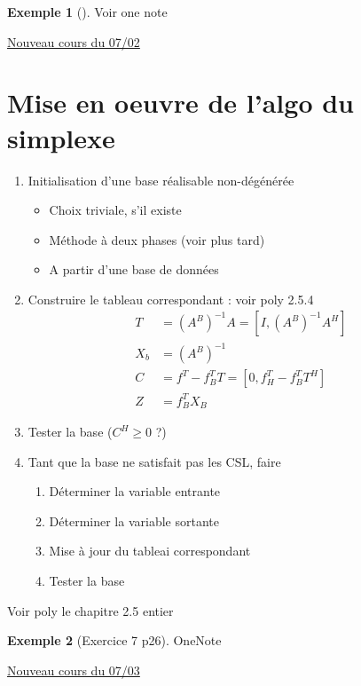 \documentclass{article}
\theoremstyle{plain}%
\theoremstyle{definition}
\newtheorem{exmp}{Exemple}[section]
\theoremstyle{remark}
\begin{document}
\begin{exmp}[]
    Voir one note
\end{exmp}

\underline{Nouveau cours du 07/02} \\

\section{Mise en oeuvre de l'algo du simplexe}
\begin{enumerate}
    \item Initialisation d'une base réalisable non-dégénérée 
        \begin{itemize}
            \item Choix triviale, s'il existe 
            \item Méthode à deux phases (voir plus tard)
            \item A partir d'une base de données
        \end{itemize}
    \item Construire le tableau correspondant : voir poly 2.5.4
        \begin{align*}
            T &= (A^B)^{-1}A = [I, (A^B)^{-1}A^H] \\
            X_b &= (A^B)^{-1} \\
            C &= f^T - f^T_{B}T = [0, f^T_H - f^T_{B}T^H] \\
            Z &= f^T_B X_B
        \end{align*}
    \item Tester la base ($ C^H \geq 0 $ ?)
    \item Tant que la base ne satisfait pas les CSL, faire 
        \begin{enumerate}
            \item Déterminer la variable entrante 
            \item Déterminer la variable sortante
            \item Mise à jour du tableai correspondant 
            \item Tester la base
        \end{enumerate}
\end{enumerate}
Voir poly le chapitre 2.5 entier
\begin{exmp}[Exercice 7 p26]
    OneNote
\end{exmp}

\underline{Nouveau cours du 07/03} \\
\end{document}
